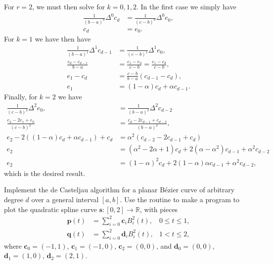 \begin{solution}
    For $r = 2$, we must then solve for $k = 0, 1, 2$.
    In the first case we simply have
    \begin{align*}
        \frac{1}{(b - a)^0} \Delta^0 c_d &= \frac{1}{(c - b)^0} \Delta^0 e_0, \\
        c_d &= e_0.
    \end{align*}
    For $k = 1$ we have then have
    \begin{align*}
        \frac{1}{(b - a)^1} \Delta^1 c_{d - 1} &= \frac{1}{(c - b)^1} \Delta^1 e_0, \\
        \frac{c_d - c_{d-1}}{b - a} &= \frac{e_1 - e_0}{c - b} = \frac{e_1 - c_d}{c - b}, \\
        e_1 - c_d &= \frac{c - b}{b - a} (c_{d-1} - c_d), \\
        e_1 &= (1 - \alpha) c_d + \alpha c_{d-1}.
    \end{align*}
    Finally, for $k = 2$ we have
    \begin{align*}
        \frac{1}{(c - b)^2} \Delta^2 e_0, &= \frac{1}{(b - a)^2} \Delta^2 c_{d - 2} \\
        \frac{e_2 - 2 e_1 + e_0}{(c-b)^2} &= \frac{c_{d} - 2 c_{d-1} + c_{d-2}}{(b-a)^2}, \\
        e_2 - 2 \left( (1 - \alpha) c_d + \alpha c_{d-1} \right) + c_d &= \alpha^2 \left( c_{d-2} - 2 c_{d-1} + c_d \right) \\
        e_2 &= \left( \alpha^2 - 2 \alpha + 1 \right) c_d + 2 \left( \alpha - \alpha^2 \right) c_{d-1} + \alpha^2 c_{d-2} \\
        e_2 &= (1 - \alpha)^2 c_d + 2(1 - \alpha) \alpha c_{d-1} + \alpha^2 c_{d-2},
    \end{align*}
    which is the desired result.
\end{solution}

\begin{exercise}
    Implement the de Casteljau algorithm for a planar Bézier curve of arbitrary degree $d$ over a general interval $[a, b]$.
    Use the routine to make a program to plot the quadratic spline curve $\mathbf{s} : [0, 2] \to \mathbb{R}$, with pieces
    \begin{align*}
        \mathbf{p}(t) &= \sum_{i=0}^{2} \mathbf{c}_i B_{i}^2(t), & 0 \leq t \leq 1, \\
        \mathbf{q}(t) &= \sum_{i=0}^{2} \mathbf{d}_i B_{i}^2(t), & 1 < t \leq 2,
    \end{align*}
    where $\mathbf{c}_0 = (-1, 1)$, $\mathbf{c}_1 = (-1, 0)$, $\mathbf{c}_2 = (0, 0)$, and $\mathbf{d}_0 = (0, 0)$, $\mathbf{d}_1 = (1, 0)$, $\mathbf{d}_2 = (2, 1)$.
\end{exercise}

